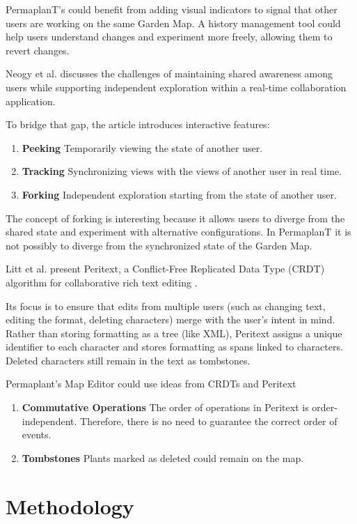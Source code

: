 \documentclass[final,oneside]{vutinfth}
\begin{document}
PermaplanT's could benefit from adding visual indicators to signal that other users are working on the same Garden Map.
A history management tool could help users understand changes and experiment more freely, allowing them to revert changes.

Neogy et al. discusses the challenges of maintaining shared awareness among users while supporting independent exploration within a real-time collaboration application. \cite{collaboration_visualizations} 

To bridge that gap, the article introduces interactive features:
\begin{enumerate}
    \item \textbf{Peeking} Temporarily viewing the state of another user.
    \item \textbf{Tracking} Synchronizing views with the views of another user in real time.
    \item \textbf{Forking} Independent exploration starting from the state of another user.
\end{enumerate}

The concept of forking is interesting because it allows users to diverge from the shared state and experiment with alternative configurations.
In PermaplanT it is not possibly to diverge from the synchronized state of the Garden Map.

Litt et al. present Peritext, a Conflict-Free Replicated Data Type (CRDT) algorithm for collaborative rich text editing \cite{peritext}.

Its focus is to ensure that edits from multiple users (such as changing text, editing the format, deleting characters) merge with the user's intent in mind.
Rather than storing formatting as a tree (like XML), Peritext assigns a unique identifier to each character and stores formatting as spans linked to characters.
Deleted characters still remain in the text as tombstones.

Permaplant's Map Editor could use ideas from CRDTs and Peritext
\begin{enumerate}
    \item \textbf{Commutative Operations} The order of operations in Peritext is order-independent.
    Therefore, there is no need to guarantee the correct order of events.
    \item \textbf{Tombstones} Plants marked as deleted could remain on the map.
\end{enumerate}

\chapter{Methodology}
\end{document}
